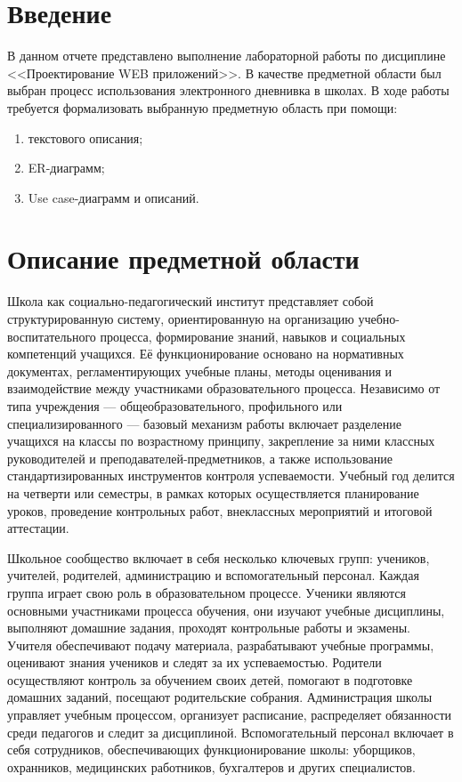 \documentclass[a4paper, final]{article}
\begin{document}
\newpage

\tableofcontents

\newpage

\cleardoublepage
{}

\section*{Введение}
В данном отчете представлено выполнение лабораторной работы по дисциплине <<Проектирование WEB приложений>>. В качестве предметной области был выбран процесс использования электронного дневнивка в школах.
В ходе работы требуется формализовать выбранную предметную область при помощи:
\begin{enumerate}
    \item текстового описания;
    \item ER-диаграмм;
    \item Use case-диаграмм и описаний.
\end{enumerate}

\newpage
\section{Описание предметной области}
Школа как социально-педагогический институт представляет собой структурированную систему, ориентированную на организацию учебно-воспитательного процесса, формирование знаний, навыков и социальных компетенций учащихся. Её функционирование основано на нормативных документах, регламентирующих учебные планы, методы оценивания и взаимодействие между участниками образовательного процесса. Независимо от типа учреждения --- общеобразовательного, профильного или специализированного --- базовый механизм работы включает разделение учащихся на классы по возрастному принципу, закрепление за ними классных руководителей и преподавателей-предметников, а также использование стандартизированных инструментов контроля успеваемости. Учебный год делится на четверти или семестры, в рамках которых осуществляется планирование уроков, проведение контрольных работ, внеклассных мероприятий и итоговой аттестации.

Школьное сообщество включает в себя несколько ключевых групп: учеников, учителей, родителей, администрацию и вспомогательный персонал. Каждая группа играет свою роль в образовательном процессе. Ученики являются основными участниками процесса обучения, они изучают учебные дисциплины, выполняют домашние задания, проходят контрольные работы и экзамены. Учителя обеспечивают подачу материала, разрабатывают учебные программы, оценивают знания учеников и следят за их успеваемостью. Родители осуществляют контроль за обучением своих детей, помогают в подготовке домашних заданий, посещают родительские собрания. Администрация школы управляет учебным процессом, организует расписание, распределяет обязанности среди педагогов и следит за дисциплиной. Вспомогательный персонал включает в себя сотрудников, обеспечивающих функционирование школы: уборщиков, охранников, медицинских работников, бухгалтеров и других специалистов.
\end{document}
